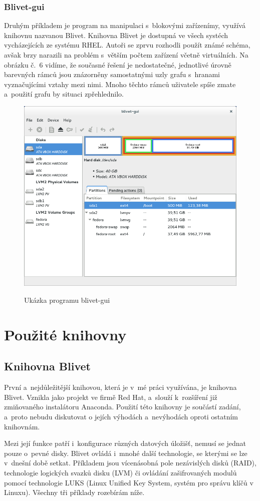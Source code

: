 \documentclass[color,table,oneside,nolot,nolof]{fithesis}
\begin{document}
 \subsection{Blivet-gui}

 Druhým příkladem je program na manipulaci s~blokovými zařízenímy, využívá knihovnu nazvanou Blivet. Knihovna Blivet je dostupná ve všech systéch vycházejících ze systému RHEL. Autoři 
 se zprvu rozhodli použít známé schéma, avšak brzy narazili na problém s~větším počtem zařízení včetně virtuálních. Na obrázku č.~6 vidíme, že současné řešení je nedostatečné, jednotlivé úrovně barevných rámců 
 jsou znázorněny samostatnými uzly grafu s~hranami vyznačujícími vztahy mezi nimi. Mnoho těchto rámců uživatele spíše zmate a~použití grafu by situaci zpřehlednilo.

 \begin{figure}[h!]
	 \label{fig:blivet}
	 \caption{Ukázka programu blivet-gui~\cite{blivet-gui}}
	 \centering
	 \includegraphics[width=.6\columnwidth]{pictures/blivet-gui-1.png}\\
 \end{figure}

\chapter{Použité knihovny}
\section{Knihovna Blivet}
	První a~nejdůležitější knihovou, která je v~mé práci využívána, je knihovna Blivet. Vznikla jako projekt
	ve firmě Red Hat, a~slouží k~rozšíření již zmiňovaného instalátoru Anaconda. Použití této knihovny je součástí zadání, a~proto nebudu diskutovat o jejích výhodách a~nevýhodách oproti ostatním knihovnám. 

	Mezi její funkce patří i~konfigurace různých datových úložišť, nemusí se jednat pouze o~pevné disky.
	Blivet ovládá i~mnohé další technologie, se kterými se lze v~dnešní době setkat. Příkladem jsou vícenásobná pole nezávislých disků (RAID), technologie logických svazků disku (LVM) či 
	ovládání zašifrovaných modulů pomocí technologie LUKS (Linux Unified Key System, systém pro správu klíčů v Linuxu). Všechny tři příklady rozebírám níže.
\end{document}
